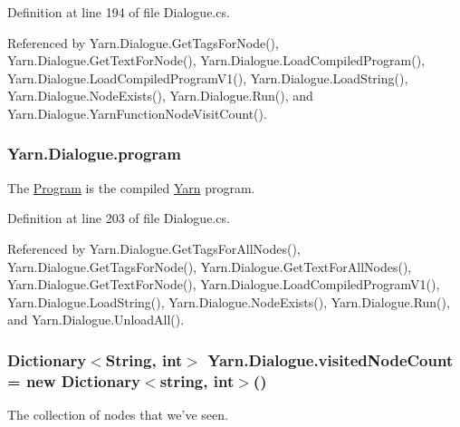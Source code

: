 Definition at line 194 of file Dialogue.\-cs.



Referenced by Yarn.\-Dialogue.\-Get\-Tags\-For\-Node(), Yarn.\-Dialogue.\-Get\-Text\-For\-Node(), Yarn.\-Dialogue.\-Load\-Compiled\-Program(), Yarn.\-Dialogue.\-Load\-Compiled\-Program\-V1(), Yarn.\-Dialogue.\-Load\-String(), Yarn.\-Dialogue.\-Node\-Exists(), Yarn.\-Dialogue.\-Run(), and Yarn.\-Dialogue.\-Yarn\-Function\-Node\-Visit\-Count().

\hypertarget{a00092_a0a1cca92325f430425d784d416cb5c2b}{
\subsubsection[{program}]{ Yarn.\-Dialogue.\-program\hspace{0.3cm}{\ttfamily [package]}}}\label{a00092_a0a1cca92325f430425d784d416cb5c2b}


The \hyperlink{a00152}{Program} is the compiled \hyperlink{a00051}{Yarn} program. 



Definition at line 203 of file Dialogue.\-cs.



Referenced by Yarn.\-Dialogue.\-Get\-Tags\-For\-All\-Nodes(), Yarn.\-Dialogue.\-Get\-Tags\-For\-Node(), Yarn.\-Dialogue.\-Get\-Text\-For\-All\-Nodes(), Yarn.\-Dialogue.\-Get\-Text\-For\-Node(), Yarn.\-Dialogue.\-Load\-Compiled\-Program\-V1(), Yarn.\-Dialogue.\-Load\-String(), Yarn.\-Dialogue.\-Node\-Exists(), Yarn.\-Dialogue.\-Run(), and Yarn.\-Dialogue.\-Unload\-All().

\hypertarget{a00092_aae9e64354066a1e2fa130629959d772b}{
\subsubsection[{visited\-Node\-Count}]{\setlength{\rightskip}{0pt plus 5cm}Dictionary$<${\bf String}, int$>$ Yarn.\-Dialogue.\-visited\-Node\-Count = new Dictionary$<$string, int$>$()}}\label{a00092_aae9e64354066a1e2fa130629959d772b}


The collection of nodes that we've seen. 



